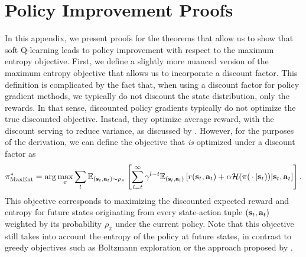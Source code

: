 
\makeatletter
\def\mathcolor#1#{\@mathcolor{#1}}
\def\@mathcolor#1#2#3{%
  \protect\leavevmode
  \begingroup
    \color#1{#2}#3%
  \endgroup
}
\makeatother

\newcommand{\EE}[2]{\mathbb{E}_{#1}\left[#2\right]}
\newcommand{\pitilde}{\tilde{\pi}}
\newcommand{\pitildered}{\mathcolor{red}{\pitilde}}
\newcommand{\Qpisoft}{Q^{\pi}_{\text{soft}}}
\newcommand{\Qpitildesoft}{Q^{\tilde{\pi}}_{\text{soft}}}
\newcommand{\Qpistarsoft}{Q^{\pi^*}_{\text{soft}}}
\newcommand{\Vpisoft}{V^{\pi}_{\text{soft}}}
\newcommand{\eps}{\varepsilon}


\onecolumn

\appendix
\appendixpage
\section{Policy Improvement Proofs}
\label{app:proofs}

In this appendix, we present proofs for the theorems that allow us to show that soft Q-learning leads to policy improvement with respect to the maximum entropy objective.
First, we define a slightly more nuanced version of the maximum entropy objective that allows us to incorporate a discount factor. This definition is complicated by the fact that, when using a discount factor for policy gradient methods, we typically do not discount the state distribution, only the rewards. In that sense, discounted policy gradients typically do not optimize the true discounted objective. Instead, they optimize average reward, with the discount serving to reduce variance, as discussed by \citet{thomas2014bias}. However, for the purposes of the derivation, we can define the objective that \emph{is} optimized under a discount factor as
\begin{align*}
\pi_\text{MaxEnt}^* = 
\arg\max_\pi \sum_t \EE{(\st,\at) \sim \rho_\pi}{
\sum_{l=t}^\infty \discount^{l-t} \EE{(\state_l,\action_l)}{ \reward(\st,\at) + \temp \ent(\pi(\sdots|\st)) | \st, \at }
}.
\end{align*}
This objective corresponds to maximizing the discounted expected reward and entropy for future states originating from every state-action tuple $({\mathbf{s}_t},{\mathbf{a}_t})$ weighted by its probability $\rho_\pi$ under the current policy. Note that this objective still takes into account the entropy of the policy at future states, in contrast to greedy objectives such as Boltzmann exploration or the approach proposed by \citet{o2016pgq}.

